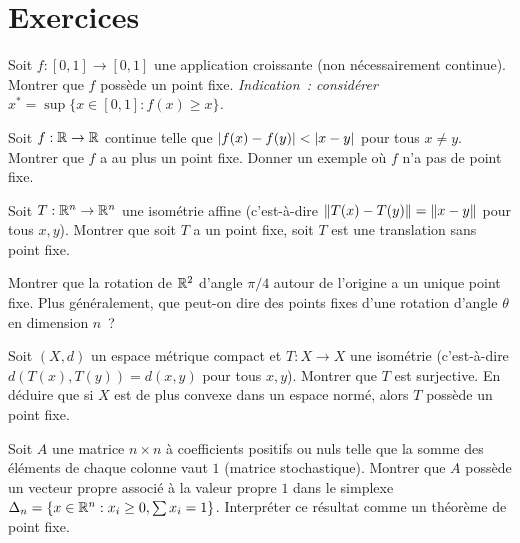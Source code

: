 \section{Exercices}

\begin{exercice}
Soit $f : [0,1] \to [0,1]$ une application croissante (non n\'ecessairement
continue). Montrer que $f$ poss\`ede un point fixe.
\textit{Indication~: consid\'erer $x^* = \sup\{x \in [0,1] : f(x) \geq x\}$.}
\end{exercice}

\begin{exercice}
Soit $f : \mathbb{R} \to \mathbb{R}$ continue telle que $\left| f(x) - f(y) \right| < \left| x - y \right|$ pour
tous $x \neq y$. Montrer que $f$ a au plus un point fixe. Donner un exemple o\`u
$f$ n'a pas de point fixe.
\end{exercice}

\begin{exercice}
Soit $T : \mathbb{R}^n \to \mathbb{R}^n$ une isom\'etrie affine (c'est-\`a-dire $\left\| T(x) - T(y) \right\| = \left\| x - y \right\|$
pour tous $x, y$). Montrer que soit $T$ a un point fixe, soit $T$ est une
translation sans point fixe.
\end{exercice}

\begin{exercice}
Montrer que la rotation de $\mathbb{R}^2$ d'angle $\pi/4$ autour de l'origine a un
unique point fixe. Plus g\'en\'eralement, que peut-on dire des points fixes d'une
rotation d'angle $\theta$ en dimension $n$~?
\end{exercice}

\begin{exercice}
Soit $(X, d)$ un espace m\'etrique compact et $T : X \to X$ une isom\'etrie
(c'est-\`a-dire $d(T(x), T(y)) = d(x,y)$ pour tous $x,y$). Montrer que $T$
est surjective. En d\'eduire que si $X$ est de plus convexe dans un espace
norm\'e, alors $T$ poss\`ede un point fixe.
\end{exercice}

\begin{exercice}
Soit $A$ une matrice $n \times n$ \`a coefficients positifs ou nuls telle que la
somme des \'el\'ements de chaque colonne vaut $1$ (matrice stochastique).
Montrer que $A$ poss\`ede un vecteur propre associ\'e \`a la valeur propre $1$
dans le simplexe $\Delta_n = \{x \in \mathbb{R}^n : x_i \geq 0, \sum x_i = 1\}$.
Interpr\'eter ce r\'esultat comme un th\'eor\`eme de point fixe.
\end{exercice}
